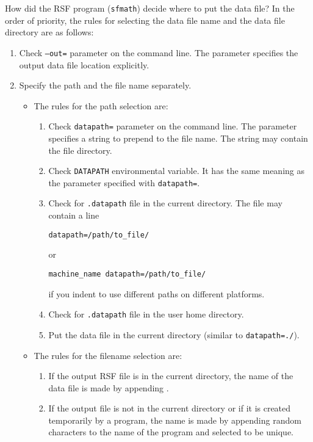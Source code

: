 How did the RSF program (\texttt{sfmath}) decide where to put the data file?
In the order of priority, the rules for selecting the data file name and the
data file directory are as follows:
\begin{enumerate}
\item Check \texttt{--out=} parameter on the command line. The parameter
  specifies the output data file location explicitly.
\item Specify the path and the file name separately. 
  \begin{itemize}
  \item The rules for the path
  selection are:
  \begin{enumerate}
  \item Check \texttt{datapath=} parameter on the command line. The parameter
    specifies a string to prepend to the file name. The string may contain the
    file directory.
  \item Check \texttt{DATAPATH} environmental variable. It has the same meaning
    as the parameter specified with \texttt{datapath=}.
  \item Check for \texttt{.datapath} file in the current directory. The file may
    contain a line 
\begin{verbatim}
datapath=/path/to_file/
\end{verbatim}
    or
\begin{verbatim}
machine_name datapath=/path/to_file/
\end{verbatim}
    if you indent to use different paths on different platforms.
  \item Check for \texttt{.datapath} file in the user home directory.
  \item Put the data file in the current directory (similar to \texttt{datapath=./}).
  \end{enumerate}
  \item The rules for the filename selection are:
    \begin{enumerate}
    \item If the output RSF file is in the current directory, the name of the
      data file is made by appending \@.
    \item If the output file is not in the current directory or if it is
    created temporarily by a program, the name is made by appending random
    characters to the name of the program and selected to be unique.
  \end{enumerate}
  \end{itemize}
\end{enumerate}

